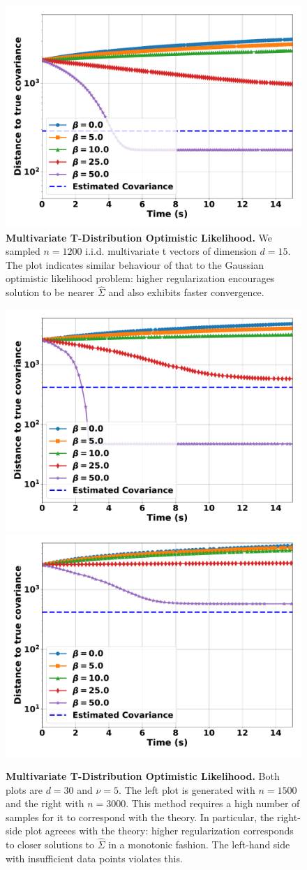 \documentclass[sn-nature]{sn-jnl}%
\theoremstyle{thmstyleone}%
\theoremstyle{thmstyletwo}%
\theoremstyle{thmstylethree}%
\begin{document}
\begin{figure}[ht]
    \centering
    \includegraphics[width=0.43\linewidth]{figuresV2/multivar_t/t_aux_nu5_d15_n1200.pdf}
    \caption{\textbf{Multivariate T-Distribution Optimistic Likelihood.} We sampled $n=1200$ i.i.d. multivariate t vectors of dimension $d=15$. The plot indicates similar behaviour of that to the Gaussian optimistic likelihood problem: higher regularization encourages solution to be nearer $\hat{\Sigma}$ and also exhibits faster convergence.}
    \label{fig:multivar_t_aux_figs}
\end{figure}



\begin{figure}[ht]
    \centering
    \includegraphics[width=0.43\linewidth]{figuresV2/multivar_t/t_aux_nu5_d30_n1500.pdf}
    \includegraphics[width=0.43\linewidth]{figuresV2/multivar_t/t_aux_nu5_d30_n3000.pdf}
    \caption{\textbf{Multivariate T-Distribution Optimistic Likelihood.} Both plots are $d=30$ and $\nu = 5$. The left plot is generated with $n=1500$ and the right with $n=3000$. This method requires a high number of samples for it to correspond with the theory. In particular, the right-side plot agreees with the theory: higher regularization corresponds to closer solutions to $\hat{\Sigma}$ in a monotonic fashion. The left-hand side with insufficient data points violates this.}
    \label{fig:multivar_t_aux_high_samples}
\end{figure}
\end{document}
